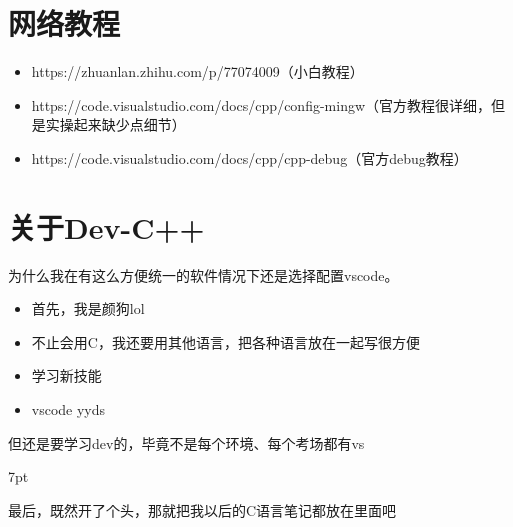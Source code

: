 \documentclass{book}
\newenvironment{formal2}{%
\def\FrameCommand{%
\hspace{1pt}%
{\color{Green}\vrule width 2pt}%
{\color{DarkSeaGreen1}\vrule width 4pt}%
\colorbox{greenshade}%
}%
\MakeFramed{\advance\hsize-\width\FrameRestore}%
\noindent\hspace{-4.55pt}%
\begin{adjustwidth}{}{7pt}%
\vspace{2pt}\vspace{2pt}%
}
{%
\vspace{2pt}\end{adjustwidth}\endMakeFramed%
}
\begin{document}
\section{网络教程}
\begin{itemize}
    \item https://zhuanlan.zhihu.com/p/77074009（小白教程）
    \item https://code.visualstudio.com/docs/cpp/config-mingw（官方教程很详细，但是实操起来缺少点细节）
    \item https://code.visualstudio.com/docs/cpp/cpp-debug（官方debug教程）
\end{itemize}

\section{关于Dev-C++}
为什么我在有这么方便统一的软件情况下还是选择配置vscode。
\begin{itemize}
    \item 首先，我是颜狗lol
    \item 不止会用C，我还要用其他语言，把各种语言放在一起写很方便
    \item 学习新技能
    \item vscode yyds
\end{itemize}
但还是要学习dev的，毕竟不是每个环境、每个考场都有vs
\begin{formal2}
最后，既然开了个头，那就把我以后的C语言笔记都放在里面吧
\end{formal2}
\end{document}
